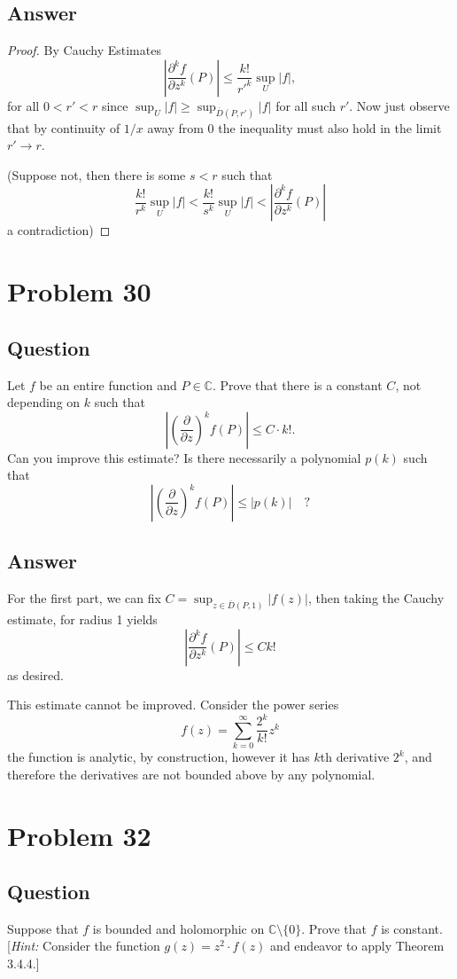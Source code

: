 \documentclass[11pt]{article}
\begin{document}
\subsection{Answer}
\begin{proof}
By Cauchy Estimates
\[\left| \frac{\partial^k f}{\partial z^k } (P) \right| \leq \frac{k!}{r'^k} \sup_U|f|,\]
for all $0 < r' <r$ since $\sup_U |f| \geq \sup_{\overline{D}(P,r')}|f|$ for all such $r'$. Now just observe that by continuity of $1/x$ away from 0 the inequality must also hold in the limit $r' \to r$. 

(Suppose not, then there is some $s < r$ such that 
\[ \frac{k!}{r^k} \sup_U|f| < \frac{k!}{s^k} \sup_U|f| < \left| \frac{\partial^k f}{\partial z^k } (P) \right|  \]
a contradiction) 
\end{proof}


\section{Problem 30}
\subsection{Question}
Let $f$ be an entire function and $P \in \mathbb{C}$. Prove that there is a constant $C$, not depending on $k$ such that
\[\left| \left( \frac{\partial}{\partial z} \right) ^k f(P) \right| \leq C \cdot k!.\]
Can you improve this estimate? Is there necessarily a polynomial $p(k)$ such that
\[\left| \left( \frac{\partial}{\partial z} \right) ^k f(P) \right| \leq |p(k)|\quad ?\]
\subsection{Answer}
For the first part, we can fix $C  = \sup_{z \in \overline{D}(P,1)}|f(z)|$, then taking the Cauchy estimate, for radius 1 yields
\[\left| \frac{\partial^k f}{\partial z^k}(P) \right| \leq C k!\]
as desired.

This estimate cannot be improved. Consider the power series
\[ f(z) = \sum_{k=0}^\infty \frac{2^k}{k!} z^k\]
the function is analytic, by construction, however it has $k$th derivative $2^k$, and therefore the derivatives are not bounded above by any polynomial.


\section{Problem 32}
\subsection{Question}
Suppose that $f$ is bounded and holomorphic on $\mathbb{C} \setminus \{ 0\}$. Prove that $f$ is constant. [\emph{Hint:} Consider the function $g(z) =z^2 \cdot f(z)$ and endeavor to apply Theorem 3.4.4.]
\end{document}
